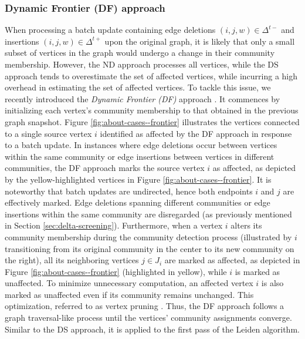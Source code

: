 \subsubsection{Dynamic Frontier (DF) approach}
\label{sec:about-frontier}

When processing a batch update containing edge deletions $(i, j, w) \in \Delta^{t-}$ and insertions $(i, j, w) \in \Delta^{t+}$ upon the original graph, it is likely that only a small subset of vertices in the graph would undergo a change in their community membership. However, the ND approach processes all vertices, while the DS approach tends to overestimate the set of affected vertices, while incurring a high overhead in estimating the set of affected vertices. To tackle this issue, we recently introduced the \textit{Dynamic Frontier (DF)} approach \cite{sahu2024dflouvain}. It commences by initializing each vertex's community membership to that obtained in the previous graph snapshot. Figure \ref{fig:about-cases--frontier} illustrates the vertices connected to a single source vertex $i$ identified as affected by the DF approach in response to a batch update. In instances where edge deletions occur between vertices within the same community or edge insertions between vertices in different communities, the DF approach marks the source vertex $i$ as affected, as depicted by the yellow-highlighted vertices in Figure \ref{fig:about-cases--frontier}. It is noteworthy that batch updates are undirected, hence both endpoints $i$ and $j$ are effectively marked. Edge deletions spanning different communities or edge insertions within the same community are disregarded (as previously mentioned in Section \ref{sec:delta-screening}). Furthermore, when a vertex $i$ alters its community membership during the community detection process (illustrated by $i$ transitioning from its original community in the center to its new community on the right), all its neighboring vertices $j \in J_i$ are marked as affected, as depicted in Figure \ref{fig:about-cases--frontier} (highlighted in yellow), while $i$ is marked as unaffected. To minimize unnecessary computation, an affected vertex $i$ is also marked as unaffected even if its community remains unchanged. This optimization, referred to as vertex pruning \cite{com-ozaki16, com-ryu16, com-shi21, com-zhang21}. Thus, the DF approach follows a graph traversal-like process until the vertices' community assignments converge. Similar to the DS approach, it is applied to the first pass of the Leiden algorithm.
